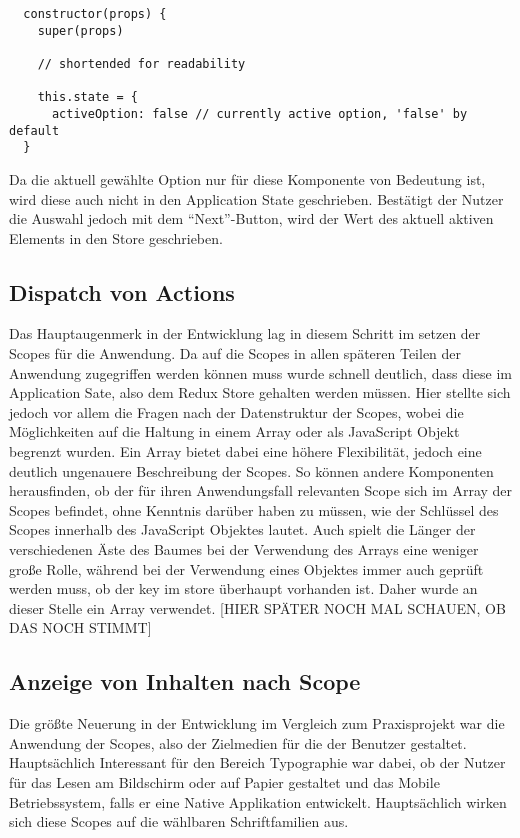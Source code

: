 \begin{lstlisting}
  constructor(props) {
    super(props)

    // shortended for readability

    this.state = {
      activeOption: false // currently active option, 'false' by default
  }
\end{lstlisting}

Da die aktuell gewählte Option nur für diese Komponente von Bedeutung ist, wird diese auch nicht in den Application State geschrieben. Bestätigt der Nutzer die Auswahl jedoch mit dem “Next”-Button, wird der Wert des aktuell aktiven Elements in den Store geschrieben.

\subsection{Dispatch von Actions}
Das Hauptaugenmerk in der Entwicklung lag in diesem Schritt im setzen der Scopes für die Anwendung. Da auf die Scopes in allen späteren Teilen der Anwendung zugegriffen werden können muss wurde schnell deutlich, dass diese im Application Sate, also dem Redux Store gehalten werden müssen. Hier stellte sich jedoch vor allem die Fragen nach der Datenstruktur der Scopes, wobei die Möglichkeiten auf die Haltung in einem Array oder als JavaScript Objekt begrenzt wurden.
Ein Array bietet dabei eine höhere Flexibilität, jedoch eine deutlich ungenauere Beschreibung der Scopes. So können andere Komponenten herausfinden, ob der für ihren Anwendungsfall relevanten Scope sich im Array der Scopes befindet, ohne Kenntnis darüber haben zu müssen, wie der Schlüssel des Scopes innerhalb des JavaScript Objektes lautet. Auch spielt die Länger der verschiedenen Äste des Baumes bei der Verwendung des Arrays eine weniger große Rolle, während bei der Verwendung eines Objektes immer auch geprüft werden muss, ob der key im store überhaupt vorhanden ist. Daher wurde an dieser Stelle ein Array verwendet.
[HIER SPÄTER NOCH MAL SCHAUEN, OB DAS NOCH STIMMT]

\subsection{Anzeige von Inhalten nach Scope}
Die größte Neuerung in der Entwicklung im Vergleich zum Praxisprojekt war die Anwendung der Scopes, also der Zielmedien für die der Benutzer gestaltet. Hauptsächlich Interessant für den Bereich Typographie war dabei, ob der Nutzer für das Lesen am Bildschirm oder auf Papier gestaltet und das Mobile Betriebssystem, falls er eine Native Applikation entwickelt. Hauptsächlich wirken sich diese Scopes auf die wählbaren Schriftfamilien aus.\\

